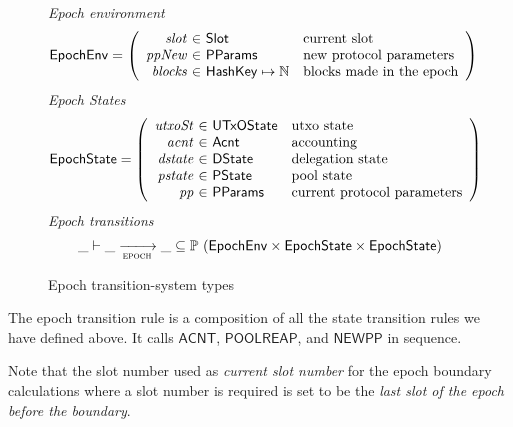 \begin{figure}[htb]
  \emph{Epoch environment}
  \begin{equation*}
    \EpochEnv =
    \left(
      \begin{array}{r@{~\in~}ll}
        \var{slot} & \Slot & \text{current slot}\\
        \var{ppNew} & \PParams & \text{new protocol parameters}\\
        \var{blocks} & \HashKey \mapsto \N & \text{blocks made in the epoch}\\
      \end{array}
    \right)
  \end{equation*}
  \emph{Epoch States}
  \begin{equation*}
    \EpochState =
    \left(
      \begin{array}{r@{~\in~}ll}
        \var{utxoSt} & \UTxOState & \text{utxo state}\\
        \var{acnt} & \Acnt & \text{accounting}\\
        \var{dstate} & \DState & \text{delegation state}\\
        \var{pstate} & \PState & \text{pool state}\\
        \var{pp} & \PParams & \text{current protocol parameters}\\
      \end{array}
    \right)
  \end{equation*}
  \emph{Epoch transitions}
  \begin{equation*}
    \_ \vdash
    \var{\_} \trans{epoch}{} \var{\_}
    \subseteq \powerset (\EpochEnv \times \EpochState \times \EpochState)
  \end{equation*}
  \caption{Epoch transition-system types}
  \label{fig:ts-types:epoch}
\end{figure}


The epoch transition rule is a composition of all the state transition rules we have defined above.
It calls $\mathsf{ACNT}$, $\mathsf{POOLREAP}$, and $\mathsf{NEWPP}$ in sequence.

Note that the slot number used as \textit{current slot number}
for the epoch boundary calculations where a slot number is required is set to
be the \textit{last slot of the epoch before the boundary}.

